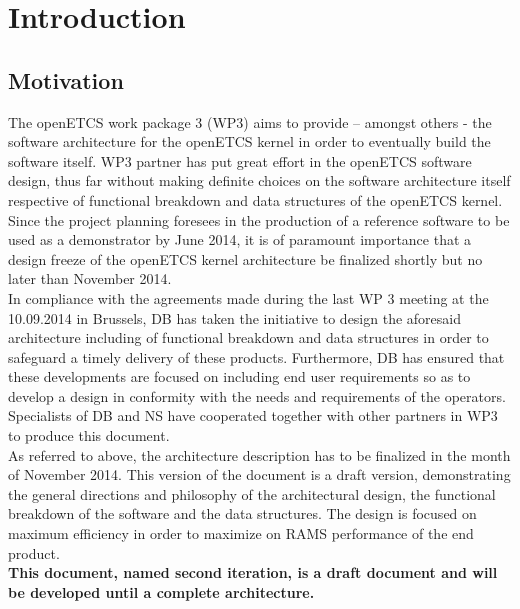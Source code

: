 \documentclass{template/openetcs_report}
\begin{document}
\mainmatter

\chapter{Introduction}

\section{Motivation}
The openETCS work package 3 (WP3) aims to provide – amongst others - the software architecture for the openETCS kernel in order to eventually build the software itself. WP3  partner has put great effort in the openETCS software design, thus far without making definite choices on the software architecture itself respective of functional breakdown and data structures of the openETCS kernel. Since the project planning foresees in the production of a reference software to be used as a demonstrator by June 2014, it is of paramount importance that a design freeze of the openETCS kernel architecture be finalized shortly but no later than November 2014.\\

In compliance with the agreements made during the last WP 3 meeting at the 10.09.2014 in Brussels, DB has taken the initiative to design the aforesaid architecture including of functional breakdown and data structures in order to safeguard a timely delivery of these products. Furthermore, DB has ensured that these developments are focused on including end user requirements so as to develop a design in conformity with the needs and requirements of the operators. Specialists of DB and NS have cooperated together with other partners in WP3 to produce this document.\\

As referred to above, the architecture description has to be finalized in the month of November 2014. This version of the document is a draft version, demonstrating the general directions and philosophy of the architectural design, the functional breakdown of the software and the data structures. The design is focused on maximum efficiency in order to maximize on RAMS performance of the end product.\\

\textbf{This document, named second iteration, is a draft document and will be developed until a complete architecture.}\\
\end{document}

